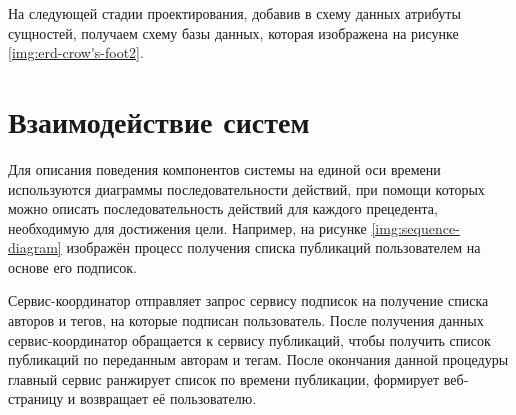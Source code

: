 На следующей стадии проектирования, добавив в схему данных атрибуты сущностей, получаем схему базы данных, которая изображена на рисунке \ref{img:erd-crow's-foot2}.


\section{Взаимодействие систем}

Для описания поведения компонентов системы на единой оси времени используются диаграммы последовательности действий, при помощи которых можно описать последовательность действий для каждого прецедента, необходимую для
достижения цели.
Например, на рисунке \ref{img:sequence-diagram} изображён процесс получения списка публикаций пользователем на основе его подписок.


Сервис-координатор отправляет запрос сервису подписок на получение списка авторов и тегов, на которые подписан пользователь.
После получения данных сервис-координатор обращается к сервису публикаций, чтобы получить список публикаций по переданным авторам и тегам.
После окончания данной процедуры главный сервис ранжирует список по времени публикации, формирует веб-страницу и возвращает её пользователю.


